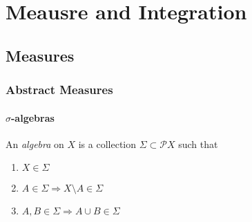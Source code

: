 \part{Meausre and Integration}

\chapter{Measures}

\section{Abstract Measures}

\subsection{\texorpdfstring{\(\sigma\)}{sigma}-algebras}

\begin{definition}
    An \emph{algebra} on \( X \) is a collection \( \Sigma \subset \mathcal{P}X \) such that
    \begin{enumerate}
        \item \( X \in \Sigma \)
        \item \( A \in \Sigma \Rightarrow X \setminus A \in \Sigma \)
        \item \( A,B \in \Sigma \Rightarrow A \cup B \in \Sigma \) 
    \end{enumerate}
\end{definition}